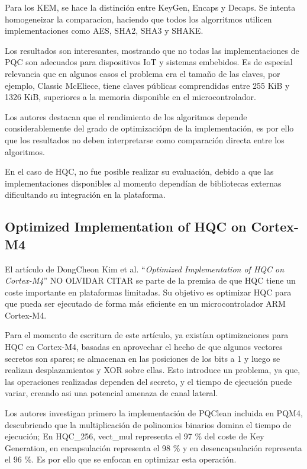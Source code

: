     Para los KEM, se hace la distinción entre KeyGen, Encaps y Decaps. Se intenta homogeneizar la comparacion, haciendo 
    que todos los algorritmos utilicen implementaciones como AES, SHA2, SHA3 y SHAKE. 

    Los resultados son interesantes, mostrando que no todas las implementaciones de PQC son adecuados para dispositivos IoT y sistemas embebidos.
    Es de especial relevancia que en algunos casos el problema era el tamaño de las claves, por ejemplo, Classic McEliece, tiene claves públicas
    comprendidas entre 255 KiB y 1326 KiB, superiores a la memoria disponible en el microcontrolador. 

    Los autores destacan que el rendimiento de los algoritmos depende considerablemente del grado de optimizaciópn de la implementación, es por ello 
    que los resultados no deben interpretarse como comparación directa entre los algoritmos. 

    En el caso de HQC, no fue posible realizar su evaluación, debido a que las implementaciones disponibles al momento dependían de 
    bibliotecas externas dificultando su integración en la plataforma.

    \subsection{Optimized Implementation of HQC on Cortex-M4}

    El artículo de DongCheon Kim et al. ``\textit{Optimized Implementation of HQC on Cortex-M4}'' NO OLVIDAR CITAR se parte de la 
    premisa de que HQC tiene un coste importante en plataformas limitadas. Su objetivo es optimizar HQC para que pueda ser ejecutado 
    de forma más eficiente en un microcontrolador ARM Cortex-M4. 

    Para el momento de escritura de este artículo, ya existían optimizaciones para HQC en Cortex-M4, basadas en aprovechar el hecho de que 
    algunos vectores secretos son spares; se almacenan en las posiciones de los bits a 1 y luego se realizan desplazamientos y XOR sobre ellas. 
    Esto introduce un problema, ya que, las operaciones realizadas dependen del secreto, y el tiempo de ejecución puede variar, creando asi 
    una potencial amenaza de canal lateral. 

    Los autores investigan primero la implementación de PQClean incluida en PQM4, descubriendo que la multiplicación de polinomios binarios 
    domina el tiempo de ejecución; En HQC\_256, vect\_mul representa el 97 \% del coste de Key Generation, en encapsulación representa el 98 \% y en desencapsulación 
    representa el 96 \%. Es por ello que se enfocan en optimizar esta operación. 

